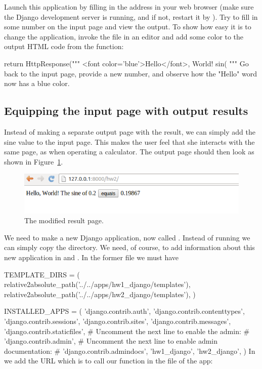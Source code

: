 \documentclass[%
oneside,                 %
final,                   %
10pt]{article}
\begin{document}
{{{{{Launch this application by filling in the address 
in your web browser (make sure the Django development server is running,
and if not, restart it by ). Try to fill
in some number on the input page and view the output.
To show how easy it is to change the application, invoke the 
file in an editor and add some color to the output HTML code from
the  function:

\bpycod
    return HttpResponse("""
<font color='blue'>Hello</font>, World!
sin(%
"""%
\epycod
Go back to the input page, provide a new number, and observe how
the "Hello" word now has a blue color.


\subsection{Equipping the input page with output results}



Instead of making a separate output page with the result, we can
simply add the sine value to the input page. This makes the user
feel that she interacts with the same page, as when operating a calculator.
The output page should then look as shown in Figure~\ref{wf:hw2:django:fig:result}.


\begin{figure}[ht]
  \centerline{\includegraphics[width=0.9\linewidth]{fig-web4sa/hw2_django_output.png}}
  \caption{
  The modified result page. \label{wf:hw2:django:fig:result}
  }
\end{figure}


We need to make a new Django application, now called .
Instead of running
 we can simply copy the 
directory. We need, of course, to add information about this
new application in  and .
In the former file we must have

\bpycod
TEMPLATE_DIRS = (
    relative2absolute_path('../../apps/hw1_django/templates'),
    relative2absolute_path('../../apps/hw2_django/templates'),
)

INSTALLED_APPS = (
    'django.contrib.auth',
    'django.contrib.contenttypes',
    'django.contrib.sessions',
    'django.contrib.sites',
    'django.contrib.messages',
    'django.contrib.staticfiles',
    # Uncomment the next line to enable the admin:
    # 'django.contrib.admin',
    # Uncomment the next line to enable admin documentation:
    # 'django.contrib.admindocs',
    'hw1_django',
    'hw2_django',
)
\epycod
In  we add the URL  which is to call our  function
in the  file of the  app:

}}}}}
\end{document}

